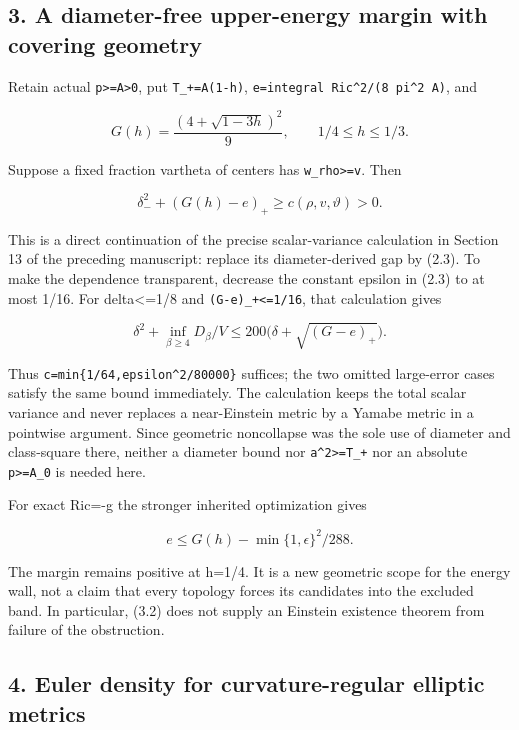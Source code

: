 \documentclass[
  10pt,
]{article}
\begin{document}
\hypertarget{a-diameter-free-upper-energy-margin-with-covering-geometry}{%
\subsection{3. A diameter-free upper-energy margin with covering
geometry}\label{a-diameter-free-upper-energy-margin-with-covering-geometry}}

Retain actual \texttt{p\textgreater{}=A\textgreater{}0}, put
\texttt{T\_+=A(1-h)},
\texttt{e=integral\ \textbar{}Ric\textbar{}\^{}2/(8\ pi\^{}2\ A)}, and

\[
 G(h)=\frac{(4+\sqrt{1-3h})^2}{9},\qquad
                        1/4\le h\le1/3.             \tag{3.1}
\]

Suppose a fixed fraction vartheta of centers has
\texttt{w\_rho\textgreater{}=v}. Then

\[
 \boxed{\delta_-^2+(G(h)-e)_+
                      \ge c(\rho,v,\vartheta)>0.}    \tag{3.2}
\]

This is a direct continuation of the precise scalar-variance calculation
in Section 13 of the preceding manuscript: replace its diameter-derived
gap by (2.3). To make the dependence transparent, decrease the constant
epsilon in (2.3) to at most 1/16. For delta\textless=1/8 and
\texttt{(G-e)\_+\textless{}=1/16}, that calculation gives

\[
 \delta^2+\inf_{\beta\ge4}D_\beta/V
           \le200\bigl(\delta+\sqrt{(G-e)_+}\bigr).
\]

Thus \texttt{c=min\{1/64,epsilon\^{}2/80000\}} suffices; the two omitted
large-error cases satisfy the same bound immediately. The calculation
keeps the total scalar variance and never replaces a near-Einstein
metric by a Yamabe metric in a pointwise argument. Since geometric
noncollapse was the sole use of diameter and class-square there, neither
a diameter bound nor \texttt{a\^{}2\textgreater{}=T\_+} nor an absolute
\texttt{p\textgreater{}=A\_0} is needed here.

For exact Ric=-g the stronger inherited optimization gives

\[
                 e\le G(h)-\min\{1,\epsilon\}^2/288. \tag{3.3}
\]

The margin remains positive at h=1/4. It is a new geometric scope for
the energy wall, not a claim that every topology forces its candidates
into the excluded band. In particular, (3.2) does not supply an Einstein
existence theorem from failure of the obstruction.

\hypertarget{euler-density-for-curvature-regular-elliptic-metrics}{%
\subsection{4. Euler density for curvature-regular elliptic
metrics}\label{euler-density-for-curvature-regular-elliptic-metrics}}
\end{document}
